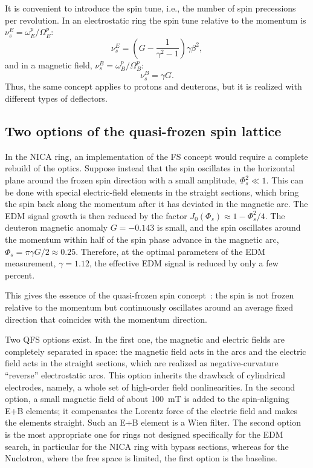 \documentclass[%
  aps,
  pra,
  preprint,
  a4paper,
  amsmath,
  amssymb,
  floatfix,
  longbibliography,
  superscriptaddress
]{revtex4-2}
\begin{document}
It is convenient to introduce the spin tune, i.e., the number of spin
precessions per revolution. In an electrostatic ring the spin tune relative
to the momentum is $\nu_s^E = \omega^p_E/\Omega^p_E$:
\begin{equation}
  \nu_s^E = \left(G-\frac{1}{\gamma^2-1}\right)\gamma\beta^2 ,
  \label{eq:nu_e}
\end{equation}
and in a magnetic field, $\nu_s^B = \omega^p_B/\Omega^p_B$:
\begin{equation}
  \nu_s^B = \gamma G .
  \label{eq:nu_b}
\end{equation}
Thus, the same concept applies to protons and deuterons, but it is realized
with different types of deflectors.

\subsection{Two options of the quasi-frozen spin lattice}

In the NICA ring, an implementation of the FS concept would require a
complete rebuild of the optics. Suppose instead that the spin oscillates in
the horizontal plane around the frozen spin direction with a small amplitude,
$\Phi_s^2 \ll 1$. This can be done with special electric-field elements in the
straight sections, which bring the spin back along the momentum after it has
deviated in the magnetic arc. The EDM signal growth is then reduced by the
factor $J_0(\Phi_s)\approx 1-\Phi_s^2/4$. The deuteron magnetic anomaly
$G=-0.143$ is small, and the spin oscillates around the momentum within half of
the spin phase advance in the magnetic arc,
$\Phi_s = \pi\gamma G/2 \approx 0.25$. Therefore, at the optimal parameters of
the EDM measurement, $\gamma = 1.12$, the effective EDM signal is reduced by
only a few percent.

This gives the essence of the quasi-frozen spin
concept~\cite{Senichev:2016rez}: the spin is not frozen relative to the
momentum but continuously oscillates around an average fixed direction that
coincides with the momentum direction.

Two QFS options exist. In the first one, the magnetic and electric fields are
completely separated in space: the magnetic field acts in the arcs and the
electric field acts in the straight sections, which are realized as
negative-curvature ``reverse'' electrostatic arcs. This option inherits the
drawback of cylindrical electrodes, namely, a whole set of high-order field
nonlinearities. In the second option, a small magnetic field of about
\SI{100}{mT} is added to the spin-aligning E+B elements; it compensates the
Lorentz force of the electric field and makes the elements straight. Such an
E+B element is a Wien filter. The second option is the most appropriate one
for rings not designed specifically for the EDM search, in particular for the
NICA ring with bypass sections, whereas for the Nuclotron, where the free
space is limited, the first option is the baseline.
\end{document}
